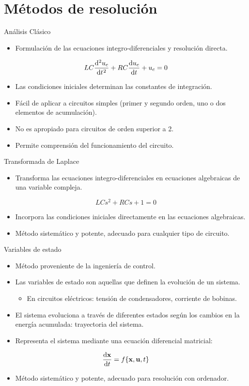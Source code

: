 \documentclass[aspectratio=169, usenames,svgnames,dvipsnames]{beamer}
\begin{document}
\section{Métodos de resolución}
\label{sec:org8dcb18e}

\begin{frame}[label={sec:org43fe6a8}]{Análisis Clásico}
\begin{itemize}
\item Formulación de las ecuaciones integro-diferenciales y resolución \alert{directa}.
\end{itemize}
\[
LC \diff[2]{u_c}{t} + RC \diff{u_c}{t} + u_c = 0
\]
\begin{itemize}
\item Las \alert{condiciones iniciales} determinan las constantes de integración.
\item Fácil de aplicar a \alert{circuitos simples} (primer y segundo orden, uno o dos elementos de acumulación).
\item No es apropiado para circuitos de orden superior a 2.
\item Permite comprensión del funcionamiento del circuito.
\end{itemize}
\end{frame}
\begin{frame}[label={sec:org1f4d94f}]{Transformada de Laplace}
\begin{itemize}
\item Transforma las ecuaciones integro-diferenciales en ecuaciones algebraicas de una variable compleja.
\end{itemize}
\[
LC s^2 + RC s + 1 = 0  
\]
\begin{itemize}
\item Incorpora las condiciones iniciales directamente en las ecuaciones algebraicas.
\item Método sistemático y potente, adecuado para cualquier tipo de circuito.
\end{itemize}
\end{frame}
\begin{frame}[label={sec:org4db4efe}]{Variables de estado}
\begin{itemize}
\item Método proveniente de la ingeniería de control.
\item Las variables de estado son aquellas que definen la evolución de un sistema.
\begin{itemize}
\item En circuitos eléctricos: tensión de condensadores, corriente de bobinas.
\end{itemize}
\item El sistema evoluciona a través de diferentes estados según los cambios en la energía acumulada: \alert{trayectoria del sistema}.
\item Representa el sistema mediante una \alert{ecuación diferencial matricial}:
\end{itemize}
\[
  \diff{\mathbf{x}}{t} = f\{\mathbf{x}, \mathbf{u}, t\}
  \]
\begin{itemize}
\item Método sistemático y potente, adecuado para resolución con ordenador.
\end{itemize}
\end{frame}
\end{document}
